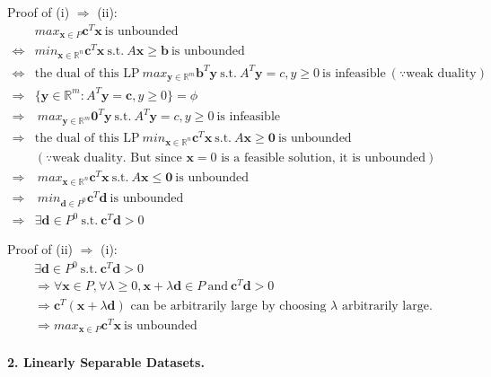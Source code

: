 \documentclass[11pt]{article}
\theoremstyle{remark}
\newcommand{\R}{\mathbb{R}}                     %
\newcommand{\bx}{\mathbf{x}}
\newcommand{\by}{\mathbf{y}}
\newcommand{\bd}{\mathbf{d}}
\newcommand{\bc}{\mathbf{c}}
\begin{document}
\begin{itemize}
Proof of (i) $\Rightarrow$ (ii):
\begin{align*}
& max_{\bx \in P} \bc^T \bx \ \text{is unbounded} &\\
\Leftrightarrow & min_{\bx \in \R^n} \bc^T \bx \ \text{s.t.} \  A\bx \geq \textbf{b} \ \text{is unbounded} &\\
\Leftrightarrow & \text{the dual of this LP} \ max_{\by \in \R^m} \textbf{b}^T \by \ \text{s.t.} \  A^T\by=c, y \geq 0 \ \text{is infeasible} \ (\because \text{weak duality})&\\
\Rightarrow & \{\by \in \R^m: A^T\by =\bc, y\geq 0\} = \phi &\\
\Rightarrow & \ max_{\by \in \R^m} \textbf{0}^T \by \ \text{s.t.} \  A^T\by=c, y \geq 0 \ \text{is infeasible} &\\
\Rightarrow & \text{the dual of this LP} \ min_{\bx \in \R^n} \bc^T \bx \ \text{s.t.} \  A\bx \geq \textbf{0} \ \text{is unbounded} &\\
&(\because \text{weak duality. But since $\bx=0$ is a feasible solution, it is unbounded})&\\
\Rightarrow & \ max_{\bx \in \R^n} \bc^T \bx \ \text{s.t.} \  A\bx \leq \textbf{0} \ \text{is unbounded} &\\
\Rightarrow & \ min_{\bd \in P^0} \bc^T \bd \ \text{is unbounded} &\\
\Rightarrow & \exists \bd \in P^0 \ \text{s.t.} \ \bc^T\bd > 0
\end{align*}

Proof of (ii) $\Rightarrow$ (i):
\begin{align*}
& \exists \bd \in P^0 \ \text{s.t.} \ \bc^T\bd > 0 &\\
& \Rightarrow \forall \bx \in P, \forall \lambda \geq 0, \bx + \lambda \bd \in P \ \text{and} \ \bc^T\bd > 0 &\\
& \Rightarrow \text{$\bc^T(\bx+\lambda \bd)$ can be arbitrarily large by choosing $\lambda$ arbitrarily large.} &\\ 
& \Rightarrow max_{\bx \in P} \bc^T \bx \ \text{is unbounded}
\end{align*}

\end{itemize}
\color{black}

\paragraph{2. Linearly Separable Datasets.}
\end{document}
